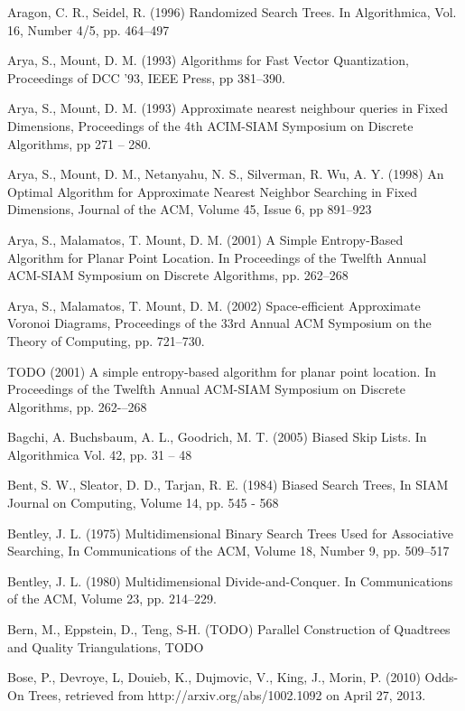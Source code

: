 \documentclass[mcs]{scsthesis}
\begin{document}
\begin{thebibliography}{5}

Aragon, C. R.,  Seidel, R. (1996) Randomized Search Trees.
In Algorithmica, Vol. 16, Number 4/5, pp. 464--497

Arya, S., Mount, D. M. (1993) Algorithms for Fast Vector Quantization,
Proceedings of DCC '93, IEEE Press, pp 381--390. 

Arya, S., Mount, D. M. (1993) Approximate nearest neighbour queries in Fixed
Dimensions, Proceedings of the 4th ACIM-SIAM Symposium on Discrete Algorithms,
pp 271 -- 280.

Arya, S., Mount, D. M., Netanyahu, N. S., Silverman, R. Wu, A. Y. (1998)
An Optimal Algorithm for Approximate Nearest Neighbor Searching in Fixed
Dimensions, Journal of the ACM, Volume 45, Issue 6, pp 891--923

Arya, S., Malamatos, T. Mount, D. M. (2001) A Simple Entropy-Based Algorithm
for Planar Point Location. In Proceedings of the Twelfth Annual ACM-SIAM
Symposium on Discrete Algorithms, pp. 262--268

Arya, S., Malamatos, T. Mount, D. M. (2002) Space-efficient Approximate
Voronoi Diagrams, Proceedings of the 33rd Annual ACM Symposium on the Theory
of Computing, pp. 721--730.

TODO (2001) A simple entropy-based algorithm for planar point location.
In Proceedings of the Twelfth Annual ACM-SIAM Symposium on Discrete Algorithms,
pp. 262-–268

Bagchi, A. Buchsbaum, A. L., Goodrich, M. T. (2005) Biased Skip Lists.
In Algorithmica Vol. 42, pp. 31 – 48

Bent, S. W., Sleator, D. D., Tarjan, R. E. (1984) Biased Search Trees,
In SIAM Journal on Computing, Volume 14, pp. 545 - 568

Bentley, J. L. (1975) Multidimensional Binary Search Trees Used for Associative
Searching, In Communications of the ACM, Volume 18, Number 9, pp. 509--517 

Bentley, J. L. (1980) Multidimensional Divide-and-Conquer.
In Communications of the ACM, Volume 23, pp. 214--229.

Bern, M., Eppstein, D., Teng, S-H. (TODO) Parallel Construction of Quadtrees and
Quality Triangulations, TODO

Bose, P., Devroye, L, Douieb, K., Dujmovic, V., King, J., Morin, P. (2010)
Odds-On Trees, retrieved from http://arxiv.org/abs/1002.1092 on April 27, 2013.


\end{thebibliography}
\end{document}
